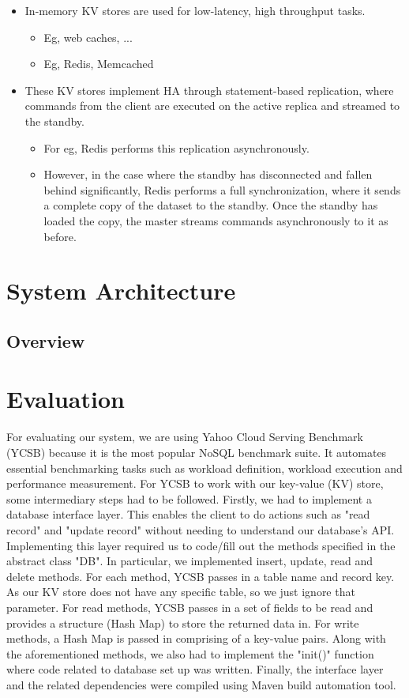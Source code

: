 \documentclass[draft]{proc}
\newcommand{\bit}{\begin{itemize}}
\newcommand{\eit}{\end{itemize}}
\begin{document}
\bit
  \item In-memory KV stores are used for low-latency, high throughput tasks.
  \bit
    \item Eg, web caches, ...
    \item Eg, Redis, Memcached
  \eit

  \item These KV stores implement HA through statement-based replication, where
  commands from the client are executed on the active replica and streamed to
  the standby.
  \bit
    \item For eg, Redis performs this replication asynchronously.
    \item However, in the case where the standby has disconnected and fallen
    behind significantly, Redis performs a full synchronization, where it sends
    a complete copy of the dataset to the standby. Once the standby has loaded
    the copy, the master streams commands asynchronously to it as before.
  \eit
\eit

\section{System Architecture}

\subsection{Overview}



\section{Evaluation}

For evaluating our system, we are using Yahoo Cloud Serving Benchmark (YCSB)
because it is the most popular NoSQL benchmark suite. It automates essential
benchmarking tasks such as workload definition, workload execution and
performance measurement. For YCSB to work with our key-value (KV) store, some
intermediary steps had to be followed. Firstly, we had to implement a database
interface layer. This enables the client to do actions such as "read record" and
"update record" without needing to understand our database's API. Implementing
this layer required us to code/fill out the methods specified in the abstract
class "DB". In particular, we implemented insert, update, read and delete
methods. For each method, YCSB passes in a table name and record key. As our KV
store does not have any specific table, so we just ignore that parameter. For
read methods, YCSB passes in a set of fields to be read and provides a structure
(Hash Map) to store the returned data in. For write methods, a Hash Map is
passed in comprising of a key-value pairs. Along with the aforementioned
methods, we also had to implement the "init()" function where code related to
database set up was written. Finally, the interface layer and the related
dependencies were compiled using Maven build automation tool.
\end{document}

